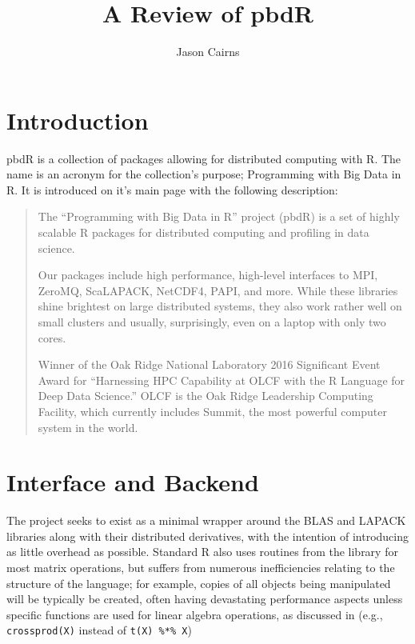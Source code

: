 \documentclass[a4paper,10pt]{article}
\begin{document}
\title{A Review of pbdR}
\author{Jason Cairns}
  
\maketitle

\section{Introduction}
\label{sec:pbdr}

pbdR is a collection of packages allowing for distributed computing with
R\cite{pbdBASEpackage}. The name is an acronym for the collection's purpose;
Programming with Big Data in R. It is introduced on it's main page with the
following description:
\begin{quote}
	The ``Programming with Big Data in R'' project (pbdR) is a set of highly scalable
	R packages for distributed computing and profiling in data science.

	Our packages include high performance, high-level interfaces to MPI, ZeroMQ,
	ScaLAPACK, NetCDF4, PAPI, and more. While these libraries shine brightest on
	large distributed systems, they also work rather well on small clusters and
	usually, surprisingly, even on a laptop with only two cores.

	Winner of the Oak Ridge National Laboratory 2016 Significant Event Award for
	``Harnessing HPC Capability at OLCF with the R Language for Deep Data Science.''
	OLCF is the Oak Ridge Leadership Computing Facility, which currently includes
	Summit, the most powerful computer system in the world.\cite{pbdR2012}
\end{quote}

\section{Interface and Backend}

The project seeks to exist as a minimal wrapper around the BLAS and LAPACK
libraries along with their distributed derivatives, with the intention of
introducing as little overhead as possible.  Standard R also uses routines from
the library for most matrix operations, but suffers from numerous
inefficiencies relating to the structure of the language; for example, copies
of all objects being manipulated will be typically be created, often having
devastating performance aspects unless specific functions are used for linear
algebra operations, as discussed in \citeauthor{schmidt2017programming} (e.g.,
\texttt{crossprod(X)} instead of \texttt{t(X) \%*\% X})
\end{document}
